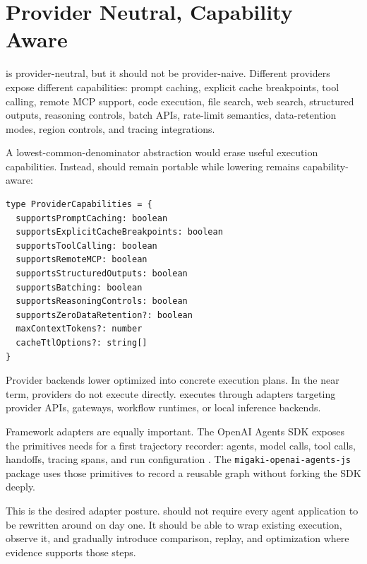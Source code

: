 \section{Provider Neutral, Capability Aware}

\migaki{} is provider-neutral, but it should not be provider-naive. Different providers expose different capabilities: prompt caching, explicit cache breakpoints, tool calling, remote MCP support, code execution, file search, web search, structured outputs, reasoning controls, batch APIs, rate-limit semantics, data-retention modes, region controls, and tracing integrations.

A lowest-common-denominator abstraction would erase useful execution capabilities. Instead, \mir{} should remain portable while lowering remains capability-aware:

\begin{lstlisting}[language={}]
type ProviderCapabilities = {
  supportsPromptCaching: boolean
  supportsExplicitCacheBreakpoints: boolean
  supportsToolCalling: boolean
  supportsRemoteMCP: boolean
  supportsStructuredOutputs: boolean
  supportsBatching: boolean
  supportsReasoningControls: boolean
  supportsZeroDataRetention?: boolean
  maxContextTokens?: number
  cacheTtlOptions?: string[]
}
\end{lstlisting}

Provider backends lower optimized \mir{} into concrete execution plans. In the near term, providers do not execute \mir{} directly. \migaki{} executes through adapters targeting provider APIs, gateways, workflow runtimes, or local inference backends.

Framework adapters are equally important. The OpenAI Agents SDK exposes the primitives \migaki{} needs for a first trajectory recorder: agents, model calls, tool calls, handoffs, tracing spans, and run configuration \citep{openai_agents_js,openai_agents_tracing}. The \texttt{migaki-openai-agents-js} package uses those primitives to record a reusable graph without forking the SDK deeply.

This is the desired adapter posture. \migaki{} should not require every agent application to be rewritten around \mir{} on day one. It should be able to wrap existing execution, observe it, and gradually introduce comparison, replay, and optimization where evidence supports those steps.
